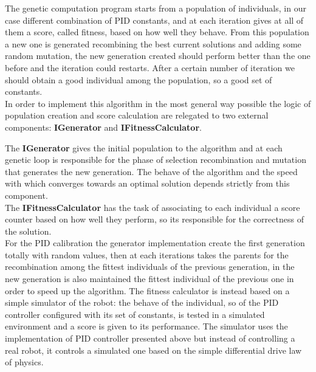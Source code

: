 \documentclass{llncs}
\begin{document}
\noindent The genetic computation program starts from a population of individuals, in our case different combination of PID constants, and at each iteration gives at all of them a score, called fitness, based on how well they behave. From this population a new one is generated recombining the best current solutions and adding some random mutation, the new generation created should perform better than the one before and the iteration could restarts. After a certain number of iteration we should obtain a good individual among the population, so a good set of constants.\\
In order to implement this algorithm in the most general way possible the logic of population creation and score calculation are relegated to two external components: \textbf{IGenerator} and \textbf{IFitnessCalculator}. 
\begin{center}
\end{center} 
\noindent The \textbf{IGenerator} gives the initial population to the algorithm and at each genetic loop is responsible for the phase of selection recombination and mutation that generates the new generation. The behave of the algorithm and the speed with which converges towards an optimal solution depends strictly from this component.\\
The \textbf{IFitnessCalculator} has the task of associating to each individual a score counter based on how well they perform, so its responsible for the correctness of the solution.\\
For the PID calibration the generator implementation create the first generation totally with random values, then at each iterations takes the parents for the recombination among the fittest individuals of the previous generation, in the new generation is also maintained the fittest individual of the previous one in order to speed up the algorithm. The fitness calculator is instead based on a simple simulator of the robot: the behave of the individual, so of the PID controller configured with its set of constants, is tested in a simulated environment and a score is given to its performance. The simulator uses the implementation of PID controller presented above but instead of controlling a real robot, it controls a simulated one based on the simple differential drive law of physics.


\end{document}
